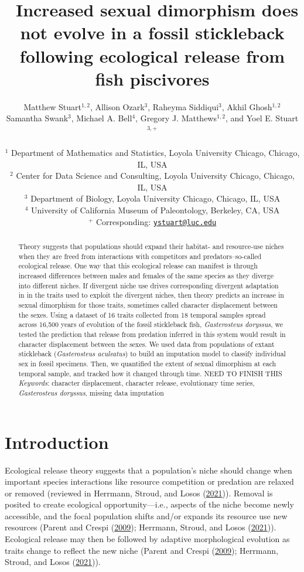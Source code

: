 \documentclass[
  12pt,
]{article}
\title{~\Large Increased sexual dimorphism does not evolve in a fossil
stickleback following ecological release from fish piscivores}
\author{\large Matthew Stuart\(^{1,2}\), Allison Ozark\(^{3}\), Raheyma
Siddiqui\(^3\), Akhil Ghosh\(^{1,2}\)\\
\large Samantha Swank\(^3\), Michael A. Bell\(^4\), Gregory J.
Matthews\(^{1,2}\), and Yoel E. Stuart\(^{3,+}\)\\
\vspace{-1.1mm}\\
\large \(^1\) Department of Mathematics and Statistics, Loyola
University Chicago, Chicago, IL, USA \vspace{-1.1mm}\\
\large \(^2\) Center for Data Science and Consulting, Loyola University
Chicago, Chicago, IL, USA \vspace{-1.1mm}\\
\large \(^3\) Department of Biology, Loyola University Chicago, Chicago,
IL, USA \vspace{-1.1mm}\\
\large \(^4\) University of California Museum of Paleontology, Berkeley,
CA, USA \vspace{-1.1mm}\\
\large \(^+\) Corresponding:
\href{mailto:ystuart@luc.edu}{\nolinkurl{ystuart@luc.edu}}
\vspace{-1.1mm}}
\date{}
\begin{document}
\maketitle
\begin{abstract}
Theory suggests that populations should expand their habitat- and
resource-use niches when they are freed from interactions with
competitors and predators--so-called ecological release. One way that
this ecological release can manifest is through increased differences
between males and females of the same species as they diverge into
different niches. If divergent niche use drives corresponding divergent
adaptation in in the traits used to exploit the divergent niches, then
theory predicts an increase in sexual dimorphism for those traits,
sometimes called character displacement between the sexes. Using a
dataset of 16 traits collected from 18 temporal samples spread across
16,500 years of evolution of the fossil stickleback fish,
\emph{Gasterosteus doryssus}, we tested the prediction that release from
predation inferred in this system would result in character displacement
between the sexes. We used data from populations of extant stickleback
(\emph{Gasterosteus aculeatus}) to build an imputation model to classify
individual sex in fossil specimens. Then, we quantified the extent of
sexual dimorphism at each temporal sample, and tracked how it changed
through time. NEED TO FINISH THIS \vspace{2mm}\\
\emph{Keywords}: character displacement, character release, evolutionary
time series, \emph{Gasterosteus doryssus}, missing data imputation
\end{abstract}

\newcommand{\iid}{\overset{iid}{\sim}}

\newpage

\hypertarget{sec:intro}{%
\section{Introduction}\label{sec:intro}}

Ecological release theory suggests that a population's niche should
change when important species interactions like resource competition or
predation are relaxed or removed (reviewed in Herrmann, Stroud, and
Losos (\protect\hyperlink{ref-Herrmannetal2021}{2021})). Removal is
posited to create ecological opportunity---i.e., aspects of the niche
become newly accessible, and the focal population shifts and/or expands
its resource use new resources (Parent and Crespi
(\protect\hyperlink{ref-ParentandCrespi2009}{2009}); Herrmann, Stroud,
and Losos (\protect\hyperlink{ref-Herrmannetal2021}{2021})). Ecological
release may then be followed by adaptive morphological evolution as
traits change to reflect the new niche (Parent and Crespi
(\protect\hyperlink{ref-ParentandCrespi2009}{2009}); Herrmann, Stroud,
and Losos (\protect\hyperlink{ref-Herrmannetal2021}{2021})).
\end{document}

